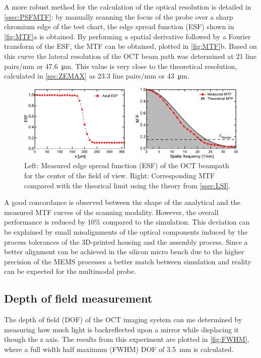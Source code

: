 \documentclass[10pt]{iopart}
\begin{document}
A more robust method for the calculation of the optical resolution is detailed in \autoref{ssec:PSFMTF}: by manually scanning the focus of the probe over a sharp chromium edge of the test chart, the edge spread function (ESF) shown in \autoref{fig:MTF}a is obtained. By performing a spatial derivative followed by a Fourier transform of the ESF, the MTF can be obtained, plotted in \autoref{fig:MTF}b. Based on this curve the lateral resolution of the OCT beam path was determined at 21 line pairs/mm or \SI{47.6}{\micro\meter}. This value is very close to the theoretical resolution, calculated in \autoref{sec:ZEMAX} as 23.3 line pairs/mm or \SI{43}{\micro\meter}.
\begin{figure}[h!]\centering \includegraphics[width=\columnwidth]{figures/confResMeas.pdf}
      \caption{Left: Measured edge spread function (ESF) of the OCT beampath for the center of the field of view. 
      Right: Corresponding MTF compared with the theorical limit using the theory from \autoref{ssec:LSI}.}
      \label{fig:MTF}
\end{figure}
A good concordance is observed between the shape of the analytical and the measured MTF curves of the scanning modality. However, the overall performance is reduced by 10\% compared to the simulation. This deviation can be explained by small misalignments of the optical components induced by the process tolerances of the 3D-printed housing and the assembly process. Since a better alignment can be achieved in the silicon micro bench due to the higher precision of the MEMS processes a better match between simulation and reality can be expected for the multimodal probe.

\subsection{Depth of field measurement}
The depth of field (DOF) of the OCT imaging system can me determined by measuring how much light is backreflected upon a mirror while displacing it though the z axis. The results from this experiment are plotted in \autoref{fig:FWHM}, where a full width half maximum (FWHM) DOF of \SI{3.5}{\milli\meter} is calculated. 
\end{document}

